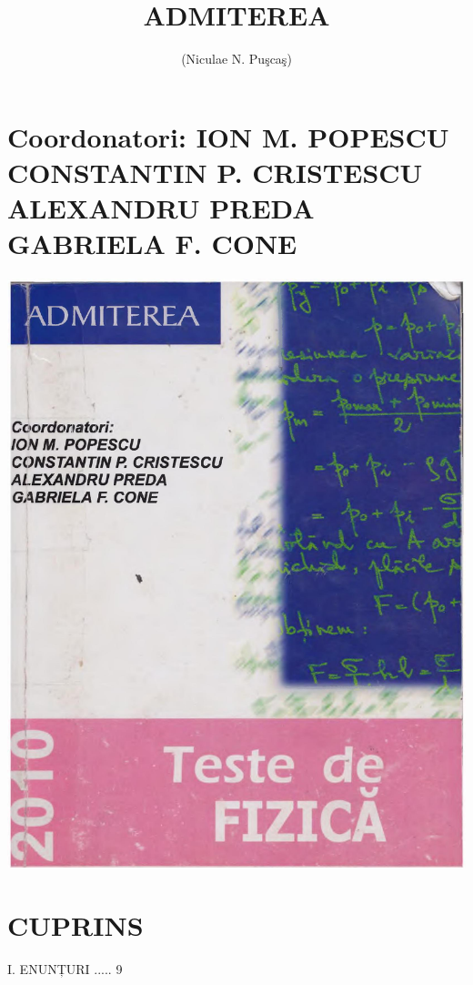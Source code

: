 \documentclass[10pt]{article}
\title{ADMITEREA }
\author{(Niculae N. Puşcaş)}
\date{}
\begin{document}
\maketitle
\section*{Coordonatori: ION M. POPESCU CONSTANTIN P. CRISTESCU ALEXANDRU PREDA GABRIELA F. CONE}
\begin{center}
\includegraphics[max width=\textwidth]{2025_07_01_5b3ff9fa0d508c8e9f17g-001}
\end{center}

\section*{CUPRINS}
I. ENUNȚURI ..... 9
\end{document}
